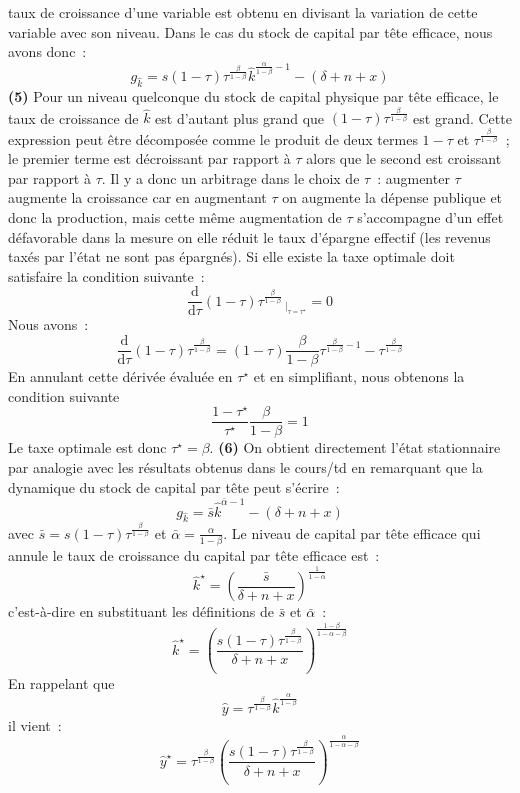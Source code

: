\documentclass[10pt,a4paper,notitlepage]{article}
\newcommand{\question}[1]{\textbf{(#1)}}
\begin{document}
taux de croissance d'une variable  est obtenu en divisant la variation
de cette variable avec son niveau. Dans le cas du stock de capital par
tête efficace, nous avons donc :
\[
g_{\hat k} = s(1-\tau)\tau^{\frac{\beta}{1-\beta}}\hat{k}^{\frac{\alpha}{1-\beta}-1} - (\delta+n+x)
\]
\question{5} Pour  un niveau quelconque  du stock de  capital physique
par tête efficace, le taux de croissance de $\hat k$ est d'autant plus
grand  que  $(1-\tau)\tau^{\frac{\beta}{1-\beta}}$  est  grand.  Cette
expression  peut  être décomposée  comme  le  produit de  deux  termes
$1-\tau$  et  $\tau^{\frac{\beta}{1-\beta}}$ ;  le premier  terme  est
décroissant par rapport à $\tau$ alors que le second est croissant par
rapport à $\tau$. Il  y a donc un arbitrage dans  le choix de $\tau$ :
augmenter $\tau$  augmente la croissance  car en augmentant  $\tau$ on
augmente la  dépense publique et  donc la production, mais  cette même
augmentation  de $\tau$  s'accompagne d'un  effet défavorable  dans la
mesure on  elle réduit le  taux d'épargne effectif (les  revenus taxés
par l'état ne sont pas épargnés). Si elle existe la taxe optimale doit satisfaire la condition suivante :
\[
\frac{\mathrm d}{\mathrm d\tau} (1-\tau)\tau^{\frac{\beta}{1-\beta}}\,  _{\biggl|_{\tau=\tau^{\star}}} = 0
\]
Nous avons :
\[
\frac{\mathrm d}{\mathrm d\tau} (1-\tau)\tau^{\frac{\beta}{1-\beta}} = (1-\tau)\frac{\beta}{1-\beta}\tau^{\frac{\beta}{1-\beta}-1}-\tau^{\frac{\beta}{1-\beta}} 
\]
En annulant cette dérivée évaluée en $\tau^{\star}$ et en simplifiant, nous obtenons la condition suivante
\[
\frac{1-\tau^{\star}}{\tau^{\star}}\frac{\beta}{1-\beta}=1
\]
Le taxe optimale est donc $\tau^{\star} = \beta$. \question{6} On obtient directement l'état stationnaire par analogie avec les résultats obtenus dans le cours/td en remarquant que la dynamique du stock de capital par tête peut s'écrire :
\[
g_{\hat k} = \bar s\hat{k}^{\bar \alpha-1} - (\delta+n+x)
\]
avec $\bar s = s(1-\tau)\tau^{\frac{\beta}{1-\beta}}$ et $\bar \alpha = \frac{\alpha}{1-\beta}$. Le niveau de capital par tête efficace qui annule le taux de croissance du capital par tête efficace est :
\[
\hat{k}^{\star} = \left(\frac{\bar s}{\delta+n+x}\right)^{\frac{1}{1-\bar\alpha}}
\]
c'est-à-dire en substituant les définitions de $\bar s$ et $\bar \alpha$ :
\[
\hat{k}^{\star} = \left(\frac{s(1-\tau)\tau^{\frac{\beta}{1-\beta}}}{\delta+n+x}\right)^{\frac{1-\beta}{1-\alpha-\beta}}
\]
En rappelant que 
\[
\hat y = \tau^{\frac{\beta}{1-\beta}}\hat{k}^{\frac{\alpha}{1-\beta}}
\]
il vient :
\[
\hat{y}^{\star} = \tau^{\frac{\beta}{1-\beta}}\left(\frac{s(1-\tau)\tau^{\frac{\beta}{1-\beta}}}{\delta+n+x}\right)^{\frac{\alpha}{1-\alpha-\beta}}
\]
\end{document}
